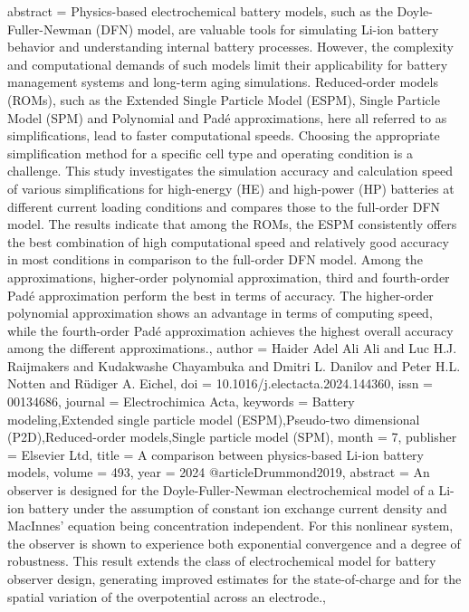{{{{{   abstract = {Physics-based electrochemical battery models, such as the Doyle-Fuller-Newman (DFN) model, are valuable tools for simulating Li-ion battery behavior and understanding internal battery processes. However, the complexity and computational demands of such models limit their applicability for battery management systems and long-term aging simulations. Reduced-order models (ROMs), such as the Extended Single Particle Model (ESPM), Single Particle Model (SPM) and Polynomial and Padé approximations, here all referred to as simplifications, lead to faster computational speeds. Choosing the appropriate simplification method for a specific cell type and operating condition is a challenge. This study investigates the simulation accuracy and calculation speed of various simplifications for high-energy (HE) and high-power (HP) batteries at different current loading conditions and compares those to the full-order DFN model. The results indicate that among the ROMs, the ESPM consistently offers the best combination of high computational speed and relatively good accuracy in most conditions in comparison to the full-order DFN model. Among the approximations, higher-order polynomial approximation, third and fourth-order Padé approximation perform the best in terms of accuracy. The higher-order polynomial approximation shows an advantage in terms of computing speed, while the fourth-order Padé approximation achieves the highest overall accuracy among the different approximations.},
   author = {Haider Adel Ali Ali and Luc H.J. Raijmakers and Kudakwashe Chayambuka and Dmitri L. Danilov and Peter H.L. Notten and Rüdiger A. Eichel},
   doi = {10.1016/j.electacta.2024.144360},
   issn = {00134686},
   journal = {Electrochimica Acta},
   keywords = {Battery modeling,Extended single particle model (ESPM),Pseudo-two dimensional (P2D),Reduced-order models,Single particle model (SPM)},
   month = {7},
   publisher = {Elsevier Ltd},
   title = {A comparison between physics-based Li-ion battery models},
   volume = {493},
   year = {2024}
}
@article{Drummond2019,
   abstract = {An observer is designed for the Doyle-Fuller-Newman electrochemical model of a Li-ion battery under the assumption of constant ion exchange current density and MacInnes’ equation being concentration independent. For this nonlinear system, the observer is shown to experience both exponential convergence and a degree of robustness. This result extends the class of electrochemical model for battery observer design, generating improved estimates for the state-of-charge and for the spatial variation of the overpotential across an electrode.},
}}}}}
